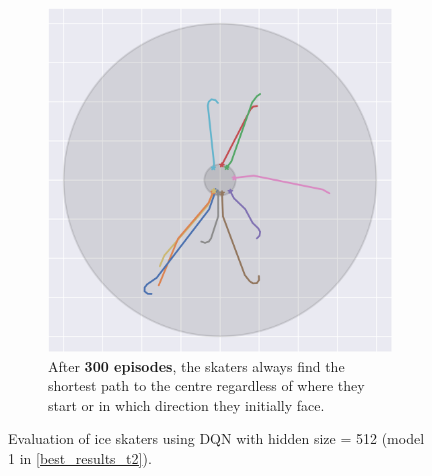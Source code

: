 \begin{figure}[H]
\begin{subfigure}[t]{.48\textwidth}
		\includegraphics[width=\textwidth]{circle_images/image_300.png}
		\caption{After \textbf{300 episodes}, the skaters always find the shortest path to the centre regardless of where they start or in which direction they initially face.}
	\end{subfigure}
	\caption{Evaluation of ice skaters using DQN with hidden size = 512 (model \colorbox{id1}{1} in \cref{best_results_t2}).}
	\label{circle_plots}
\end{figure}
